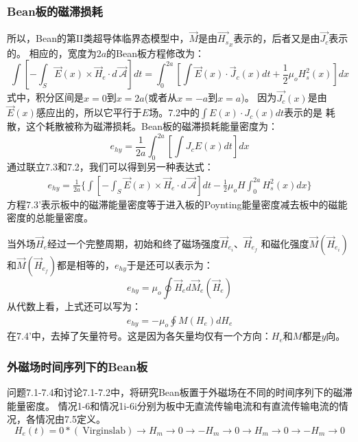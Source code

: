 \subsubsection*{Bean板的磁滞损耗}
所以，Bean的第II类超导体临界态模型中，$\vec{M}$是由$\vec{H_s}_x$表示的，后者又是由$\vec{J_c}$表示的。
相应的，宽度为$2a$的Bean板方程修改为：
\begin{equation}%
\int\left[-\int_{S}\vec{E}(x)\times\vec{H}_e\cdot d\vec{\ \mathcal{A}}\right]dt=\int_{0}^{2a}\left[\int\vec{E}(x)\cdot\vec{J}_c(x)dt+\frac{1}{2}\mu_oH_{s}^{2}(x)\right]dx
\end{equation}
式中，积分区间是$x=0$到$x=2a$(或者从$x=-a$到$x=a$)。
因为$\vec{J_c}(x)$是由$\vec{E}(x)$感应出的，所以它平行于$E$场。7.2中的$\int E(x)\cdot J_c(x)dt$表示的是
耗散，这个耗散被称为磁滞损耗。Bean板的磁滞损耗能量密度为：
\begin{equation}%
e_{hy}=\frac{1}{2a}\int_{0}^{2a}\left[\int J_cE(x)dt\right]dx
\end{equation}
通过联立7.3和7.2，我们可以得到另一种表达式：
\begin{align*}%
e_{hy}=\frac{1}{2a}\{\int\left[-\int_{S}\vec{E}(x)\times\vec{H}_e\cdot d\vec{\ \mathcal{A}}\right]dt-\frac{1}{2}\mu_oH\int_{0}^{2a}H_{s}^{2}(x)dx\} \tag{7.3'}
\end{align*}
方程7.3’表示板中的磁滞能量密度等于进入板的Poynting能量密度减去板中的磁能密度的总能量密度。

当外场$\vec{H}_e$经过一个完整周期，初始和终了磁场强度$\vec{H}_{e_i}$、$\vec{H}_{e_f}$
和磁化强度$\vec{M}(\vec{H}_{e_i})$和$\vec{M}(\vec{H}_{e_f})$都是相等的，$e_{hy}$于是还可以表示为：
\begin{equation}%
e_{hy}=\mu_o\oint\vec{H}_ed\vec{M}_e(\vec{H}_e)
\end{equation}
从代数上看，上式还可以写为：
\begin{align*}%
e_{hy}=-\mu_o\oint M(H_e)dH_e \tag{7.4'}
\end{align*}
在7.4’中，去掉了矢量符号。这是因为各矢量均仅有一个方向：$H_e$和$M$都是$y$向。

\subsubsection*{外磁场时间序列下的Bean板}
问题7.1-7.4和讨论7.1-7.2中，将研究Bean板置于外磁场在不同的时间序列下的磁滞能量密度。
情况1-6和情况1i-6i分别为板中无直流传输电流和有直流传输电流的情况，各情况由7.5定义。
\begin{equation}%
H_e(t)=0*(\ \mathrm{Virgin slab})\rightarrow H_m\rightarrow 0\rightarrow -H_m\rightarrow 0\rightarrow H_m\rightarrow 0\rightarrow -H_m\rightarrow 0
\end{equation}


